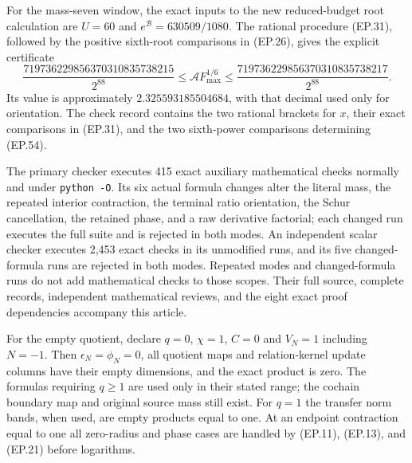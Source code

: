 For the mass-seven window, the exact inputs to the new reduced-budget
root calculation are $U=60$ and $e^{\mathcal B}=630509/1080$.
The rational procedure (EP.31), followed by the positive sixth-root
comparisons in (EP.26), gives the explicit certificate
\[
 \frac{719736229856370310835738215}{2^{88}}
 \le\mathcal A F_{\max}^{1/6}\le
 \frac{719736229856370310835738217}{2^{88}}.\tag{EP.54}
\]
Its value is approximately $2.325593185504684$, with that decimal
used only for orientation. The check record contains the two rational
brackets for $x$, their exact comparisons in (EP.31), and the two
sixth-power comparisons determining (EP.54).

The primary checker executes 415 exact auxiliary mathematical checks
normally and under \texttt{python -O}. Its six actual formula changes
alter the literal mass, the repeated interior contraction, the terminal
ratio orientation, the Schur cancellation, the retained phase, and a
raw derivative factorial; each changed run executes the full suite and
is rejected in both modes. An independent scalar checker executes
2,453 exact checks in its unmodified runs, and its five changed-formula
runs are rejected in both modes. Repeated modes and changed-formula
runs do not add mathematical checks to those scopes. Their full source,
complete records, independent mathematical reviews, and the eight exact
proof dependencies accompany this article.

For the empty quotient, declare $q=0$, $\chi=1$, $C=0$ and
$V_N=1$ including $N=-1$. Then $\epsilon_N=\phi_N=0$,
all quotient maps and relation-kernel update columns have their empty
dimensions, and the exact product is zero. The formulas requiring
$q\ge1$ are used only in their stated range; the cochain boundary
map and original source mass still exist. For $q=1$ the transfer
norm bands, when used, are empty products equal to one. At an
endpoint contraction equal to one all zero-radius and phase cases
are handled by (EP.11), (EP.13), and (EP.21) before logarithms.

\endgroup
